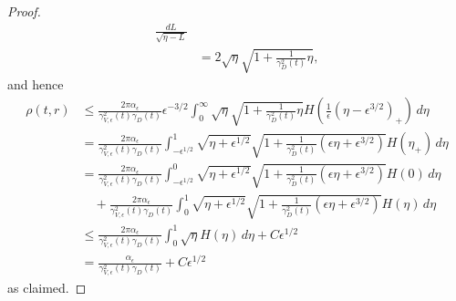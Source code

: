 \documentclass[11pt]{article}
\begin{document}
\begin{proof}
\begin{align*}
    \frac{dL}{\sqrt{\eta-L}}\\
    &=
    2  \sqrt{\eta} \sqrt{1+\frac{1}{\gamma_D^2(t)} \eta},
  \end{align*}
  and hence
  \begin{align*}
    \rho(t,r)
    &
    \leq \frac{2 \pi \alpha_\epsilon }{\gamma^2_{V,\epsilon}(t) \gamma_D(t)}
    \epsilon^{-3/2}
    \int_0^\infty \sqrt{\eta} \sqrt{1+\frac{1}{\gamma_D^2(t)} \eta}
    H\left(\frac{1}{\epsilon} \left(\eta -\epsilon^{3/2}\right)_+ \right)
    \, d\eta\\
    &
    = \frac{2 \pi \alpha_\epsilon}{\gamma^2_{V,\epsilon}(t) \gamma_D(t)}
    \int_{-\epsilon^{1/2}}^1 \sqrt{\eta+\epsilon^{1/2}}
    \sqrt{1+\frac{1}{\gamma_D^2(t)} (\epsilon \eta+\epsilon^{3/2})}
    H\left(\eta_+ \right)\, d\eta\\
    &
    = \frac{2 \pi \alpha_\epsilon}{\gamma^2_{V,\epsilon}(t) \gamma_D(t)}
    \int_{-\epsilon^{1/2}}^0 \sqrt{\eta+\epsilon^{1/2}}
    \sqrt{1+\frac{1}{\gamma_D^2(t)} (\epsilon \eta+\epsilon^{3/2})}
    H (0)\, d\eta\\
    &
    \quad {}+ \frac{2 \pi \alpha_\epsilon}{\gamma^2_{V,\epsilon}(t) \gamma_D(t)}
    \int_0^1 \sqrt{\eta+\epsilon^{1/2}}
    \sqrt{1+\frac{1}{\gamma_D^2(t)} (\epsilon \eta+\epsilon^{3/2})}
    H(\eta)\, d\eta\\
    &
    \leq
    \frac{2 \pi \alpha_\epsilon}{\gamma^2_{V,\epsilon}(t) \gamma_D(t)}
    \int_0^1 \sqrt{\eta} H(\eta)\, d\eta + C \epsilon^{1/2}\\
    &
    = \frac{\alpha_\epsilon}{\gamma^2_{V,\epsilon}(t) \gamma_D(t)} + C \epsilon^{1/2}
  \end{align*}
  as claimed.


\end{proof}
\end{document}
